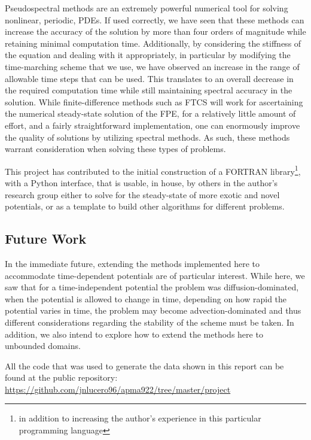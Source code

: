 \documentclass[11pt]{article}
\begin{document}
Pseudospectral methods are an extremely powerful numerical tool for solving nonlinear, periodic, PDEs. If used correctly, we have seen that these methods can increase the accuracy of the solution by more than four orders of magnitude while retaining minimal computation time. Additionally, by considering the stiffness of the equation and dealing with it appropriately, in particular by modifying the time-marching scheme that we use, we have observed an increase in the range of allowable time steps that can be used. This translates to an overall decrease in the required computation time while still maintaining spectral accuracy in the solution. While finite-difference methods such as FTCS will work for ascertaining the numerical steady-state solution of the FPE, for a relatively little amount of effort, and a fairly straightforward implementation, one can enormously improve the quality of solutions by utilizing spectral methods. As such, these methods warrant consideration when solving these types of problems.

This project has contributed to the initial construction of a FORTRAN library\footnote{in addition to increasing the author's experience in this particular programming language}, with a Python interface, that is usable, in house, by others in the author's research group either to solve for the steady-state of more exotic and novel potentials, or as a template to build other algorithms for different problems. 

\subsection{Future Work}

In the immediate future, extending the methods implemented here to accommodate time-dependent potentials are of particular interest. While here, we saw that for a time-independent potential the problem was diffusion-dominated, when the potential is allowed to change in time, depending on how rapid the potential varies in time, the problem may become advection-dominated and thus different considerations regarding the stability of the scheme must be taken. In addition, we also intend to explore how to extend the methods here to unbounded domains. 

\appendixpage
\appendix

All the code that was used to generate the data shown in this report can be found at the public repository: \\

\href{https://github.com/jnlucero96/apma922/tree/master/project}{https://github.com/jnlucero96/apma922/tree/master/project}\\
\end{document}
